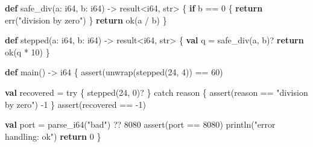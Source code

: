 \documentclass[
  english,
  oneside]{book}
\newenvironment{Shaded}{\begin{snugshade}}{\end{snugshade}}
\newcommand{\ControlFlowTok}[1]{\textcolor[rgb]{0.77,0.53,0.75}{\textbf{#1}}}
\newcommand{\DataTypeTok}[1]{\textcolor[rgb]{0.31,0.79,0.69}{#1}}
\newcommand{\DecValTok}[1]{\textcolor[rgb]{0.71,0.81,0.66}{#1}}
\newcommand{\FunctionTok}[1]{\textcolor[rgb]{0.86,0.86,0.67}{#1}}
\newcommand{\KeywordTok}[1]{\textcolor[rgb]{0.34,0.61,0.84}{\textbf{#1}}}
\newcommand{\NormalTok}[1]{\textcolor[rgb]{0.83,0.83,0.83}{#1}}
\newcommand{\OperatorTok}[1]{\textcolor[rgb]{0.83,0.83,0.83}{#1}}
\newcommand{\StringTok}[1]{\textcolor[rgb]{0.81,0.57,0.47}{#1}}
\begin{document}
\begin{Shaded}
\begin{Highlighting}[]
\KeywordTok{def}\NormalTok{ safe\_div(a: }\DataTypeTok{i64}\NormalTok{, b: }\DataTypeTok{i64}\NormalTok{) }\OperatorTok{{-}\textgreater{}} \DataTypeTok{result}\OperatorTok{\textless{}}\DataTypeTok{i64}\NormalTok{, }\DataTypeTok{str}\OperatorTok{\textgreater{}}\NormalTok{ \{}
    \ControlFlowTok{if}\NormalTok{ b }\OperatorTok{==} \DecValTok{0}\NormalTok{ \{}
        \ControlFlowTok{return} \FunctionTok{err}\NormalTok{(}\StringTok{"division by zero"}\NormalTok{)}
\NormalTok{    \}}
    \ControlFlowTok{return} \FunctionTok{ok}\NormalTok{(a }\OperatorTok{/}\NormalTok{ b)}
\NormalTok{\}}

\KeywordTok{def}\NormalTok{ stepped(a: }\DataTypeTok{i64}\NormalTok{, b: }\DataTypeTok{i64}\NormalTok{) }\OperatorTok{{-}\textgreater{}} \DataTypeTok{result}\OperatorTok{\textless{}}\DataTypeTok{i64}\NormalTok{, }\DataTypeTok{str}\OperatorTok{\textgreater{}}\NormalTok{ \{}
    \KeywordTok{val}\NormalTok{ q }\OperatorTok{=}\NormalTok{ safe\_div(a, b)}\OperatorTok{?}
    \ControlFlowTok{return} \FunctionTok{ok}\NormalTok{(q }\OperatorTok{*} \DecValTok{10}\NormalTok{)}
\NormalTok{\}}

\KeywordTok{def}\NormalTok{ main() }\OperatorTok{{-}\textgreater{}} \DataTypeTok{i64}\NormalTok{ \{}
    \FunctionTok{assert}\NormalTok{(unwrap(stepped(}\DecValTok{24}\NormalTok{, }\DecValTok{4}\NormalTok{)) }\OperatorTok{==} \DecValTok{60}\NormalTok{)}

    \KeywordTok{val}\NormalTok{ recovered }\OperatorTok{=}\NormalTok{ try \{}
\NormalTok{        stepped(}\DecValTok{24}\NormalTok{, }\DecValTok{0}\NormalTok{)}\OperatorTok{?}
\NormalTok{    \} catch reason \{}
        \FunctionTok{assert}\NormalTok{(reason }\OperatorTok{==} \StringTok{"division by zero"}\NormalTok{)}
        \OperatorTok{{-}}\DecValTok{1}
\NormalTok{    \}}
    \FunctionTok{assert}\NormalTok{(recovered }\OperatorTok{==} \OperatorTok{{-}}\DecValTok{1}\NormalTok{)}

    \KeywordTok{val}\NormalTok{ port }\OperatorTok{=} \FunctionTok{parse\_i64}\NormalTok{(}\StringTok{"bad"}\NormalTok{) }\OperatorTok{??} \DecValTok{8080}
    \FunctionTok{assert}\NormalTok{(port }\OperatorTok{==} \DecValTok{8080}\NormalTok{)}
\NormalTok{    println(}\StringTok{"error handling: ok"}\NormalTok{)}
    \ControlFlowTok{return} \DecValTok{0}
\NormalTok{\}}
\end{Highlighting}
\end{Shaded}
\end{document}
